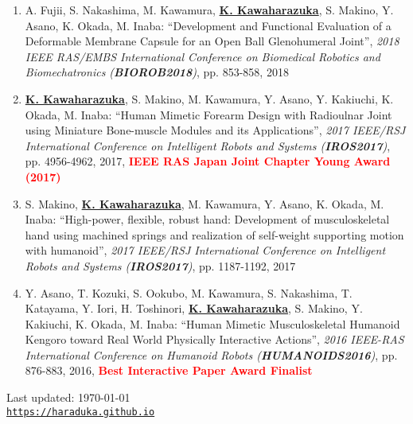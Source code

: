 \documentclass[letterpaper]{article}
\def\footerlink{https://haraduka.github.io}
\begin{document}
\begin{enumerate}
\item A. Fujii, S. Nakashima, M. Kawamura, \underline{\textbf{K. Kawaharazuka}}, S. Makino, Y. Asano, K. Okada, M. Inaba: ``Development and Functional Evaluation of a Deformable Membrane Capsule for an Open Ball Glenohumeral Joint'', \textit{2018 IEEE RAS/EMBS International Conference on Biomedical Robotics and Biomechatronics (\textit{\textbf{BIOROB2018}})}, pp. 853-858, 2018
\item \underline{\textbf{K. Kawaharazuka}}, S. Makino, M. Kawamura, Y. Asano, Y. Kakiuchi, K. Okada, M. Inaba: ``Human Mimetic Forearm Design with Radioulnar Joint using Miniature Bone-muscle Modules and its Applications'', \textit{2017 IEEE/RSJ International Conference on Intelligent Robots and Systems (\textit{\textbf{IROS2017}})}, pp. 4956-4962, 2017, \textbf{\textcolor{red}{IEEE RAS Japan Joint Chapter Young Award (2017)}}
\item S. Makino, \underline{\textbf{K. Kawaharazuka}}, M. Kawamura, Y. Asano, K. Okada, M. Inaba: ``High-power, flexible, robust hand: Development of musculoskeletal hand using machined springs and realization of self-weight supporting motion with humanoid'', \textit{2017 IEEE/RSJ International Conference on Intelligent Robots and Systems (\textit{\textbf{IROS2017}})}, pp. 1187-1192, 2017
\item Y. Asano, T. Kozuki, S. Ookubo, M. Kawamura, S. Nakashima, T. Katayama, Y. Iori, H. Toshinori, \underline{\textbf{K. Kawaharazuka}}, S. Makino, Y. Kakiuchi, K. Okada, M. Inaba: ``Human Mimetic Musculoskeletal Humanoid Kengoro toward Real World Physically Interactive Actions'', \textit{2016 IEEE-RAS International Conference on Humanoid Robots (\textit{\textbf{HUMANOIDS2016}})}, pp. 876-883, 2016, \textbf{\textcolor{red}{Best Interactive Paper Award Finalist}}
\end{enumerate}


\bigskip

\begin{center}
  \begin{footnotesize}
    Last updated: \today \\
    \href{\footerlink}{\texttt{\footerlink}}
  \end{footnotesize}
\end{center}
\end{document}

